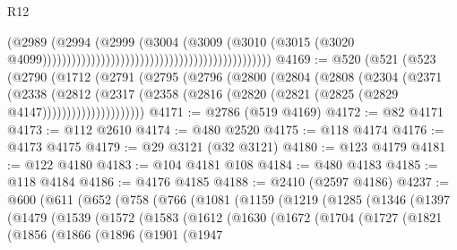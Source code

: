 \begin{lexlean}{R12}
\begin{coremodule}
                                                                                  (@2989
                                                                                    (@2994
                                                                                      (@2999
                                                                                        (@3004
                                                                                          (@3009
                                                                                            (@3010
                                                                                              (@3015
                                                                                                (@3020
                                                                                                  @4099)))))))))))))))))))))))))))))))))))))))))))))))
@4169 := @520
    (@521
      (@523
        (@2790
          (@1712
            (@2791
              (@2795
                (@2796
                  (@2800
                    (@2804
                      (@2808
                        (@2304
                          (@2371
                            (@2338
                              (@2812
                                (@2317
                                  (@2358
                                    (@2816 (@2820 (@2821 (@2825 (@2829 @4147)))))))))))))))))))))
@4171 := @2786 (@519 @4169)
@4172 := @82 @4171
@4173 := @112 @2610
@4174 := @480 @2520
@4175 := @118 @4174
@4176 := @4173 @4175
@4179 := @29 @3121 (@32 @3121)
@4180 := @123 @4179
@4181 := @122 @4180
@4183 := @104 @4181 @108
@4184 := @480 @4183
@4185 := @118 @4184
@4186 := @4176 @4185
@4188 := @2410 (@2597 @4186)
@4237 := @600
    (@611
      (@652
        (@758
          (@766
            (@1081
              (@1159
                (@1219
                  (@1285
                    (@1346
                      (@1397
                        (@1479
                          (@1539
                            (@1572
                              (@1583
                                (@1612
                                  (@1630
                                    (@1672
                                      (@1704
                                        (@1727
                                          (@1821
                                            (@1856
                                              (@1866
                                                (@1896
                                                  (@1901
                                                    (@1947

\end{coremodule}
\end{lexlean}
